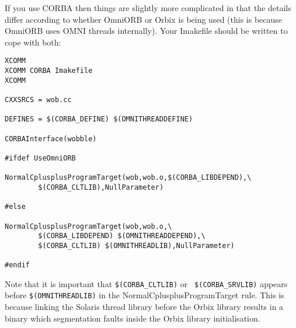\documentclass[11pt]{article}
\begin{document}
If you use CORBA then things are slightly more complicated in that the details
differ according to whether OmniORB or Orbix is being used (this is because
OmniORB uses OMNI threads internally).  Your Imakefile should be written to
cope with both:

\begin{verbatim}
XCOMM
XCOMM CORBA Imakefile
XCOMM

CXXSRCS = wob.cc

DEFINES = $(CORBA_DEFINE) $(OMNITHREADDEFINE)

CORBAInterface(wobble)

#ifdef UseOmniORB

NormalCplusplusProgramTarget(wob,wob.o,$(CORBA_LIBDEPEND),\
        $(CORBA_CLTLIB),NullParameter)

#else

NormalCplusplusProgramTarget(wob,wob.o,\
        $(CORBA_LIBDEPEND) $(OMNITHREADDEPEND),\
        $(CORBA_CLTLIB) $(OMNITHREADLIB),NullParameter)

#endif

\end{verbatim}

Note that it is important that {\tt \$(CORBA\_CLTLIB)} or {\tt
\$(CORBA\_SRVLIB)} appears before {\tt \$(OMNITHREADLIB)} in the
NormalCplusplusProgramTarget rule.  This is because linking the Solaris
thread library before the Orbix library results in a binary which segmentation
faults inside the Orbix library initialisation.
\end{document}
